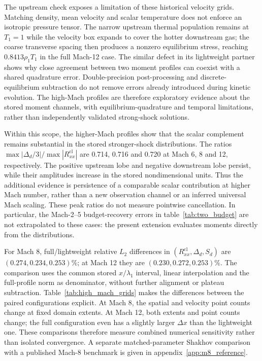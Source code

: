 \documentclass[lineno,paper]{JFM-FLM_Au}
\newenvironment{revision}{\nolinenumbers\begin{tcolorbox}[breakable,colback=revisionyellow,colframe=revisionyellow,boxrule=0pt,arc=0pt,left=5pt,right=5pt,top=5pt,bottom=5pt,before skip=6pt,after skip=6pt]\captionsetup{width=\linewidth}}{\end{tcolorbox}\linenumbers}
\newenvironment{revision}{}{}
\newcommand{\cl}{\mathrm{cl}}
\begin{document}
\begin{revision}
The upstream check exposes a limitation of these historical velocity grids. Matching density, mean velocity and scalar temperature does not enforce an isotropic pressure tensor. The narrow upstream thermal population remains at $T_1=1$ while the velocity box expands to cover the hotter downstream gas; the coarse transverse spacing then produces a nonzero equilibrium stress, reaching $0.8413\rho_1T_1$ in the full Mach-12 case. The similar defect in its lightweight partner shows why close agreement between two moment profiles can coexist with a shared quadrature error. Double-precision post-processing and discrete-equilibrium subtraction do not remove errors already introduced during kinetic evolution. The high-Mach profiles are therefore exploratory evidence about the stored moment channels, with equilibrium-quadrature and temporal limitations, rather than independently validated strong-shock solutions.

Within this scope, the higher-Mach profiles show that the scalar complement remains substantial in the stored stronger-shock distributions. The ratios $\max|\Delta_d/3|/\max|R^{\cl}_{xx}|$ are 0.714, 0.716 and 0.720 at Mach 6, 8 and 12, respectively. The positive upstream lobe and negative downstream lobe persist, while their amplitudes increase in the stored nondimensional units. Thus the additional evidence is persistence of a comparable scalar contribution at higher Mach number, rather than a new observation channel or an inferred universal Mach scaling. These peak ratios do not measure pointwise cancellation. In particular, the Mach-2--5 budget-recovery errors in table~\ref{tab:two_budget} are not extrapolated to these cases: the present extension evaluates moments directly from the distributions.

For Mach 8, full/lightweight relative $L_2$ differences in $(R^{\cl}_{xx},\Delta_d,S_d)$ are $(0.274,0.234,0.253)\%$; at Mach 12 they are $(0.230,0.272,0.253)\%$. The comparison uses the common stored $x/\lambda_1$ interval, linear interpolation and the full-profile norm as denominator, without further alignment or plateau subtraction. Table~\ref{tab:high_mach_grids} makes the differences between the paired configurations explicit. At Mach 8, the spatial and velocity point counts change at fixed domain extents. At Mach 12, both extents and point counts change; the full configuration even has a slightly larger $\Delta x$ than the lightweight one. These comparisons therefore measure combined numerical sensitivity rather than isolated convergence. A separate matched-parameter Shakhov comparison with a published Mach-8 benchmark is given in appendix~\ref{app:m8_reference}.
\end{revision}
\end{document}
